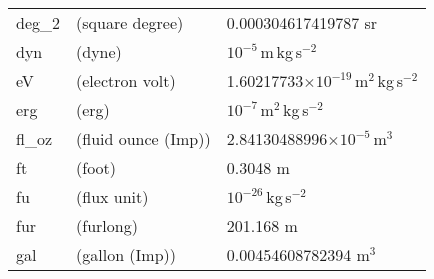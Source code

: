 \begin{table}
\begin{center}
\begin{tabular}{lll}
      deg\_2      & (square degree)               & 0.000304617419787 sr\\
      dyn        & (dyne)                        & $10^{-5}$\,m\,kg\,s$^{-2}$\\
      eV         & (electron volt)               & 1.60217733$\times10^{-19}$\,m$^{2}$\,kg\,s$^{-2}$\\
      erg        & (erg)                         & $10^{-7}$\,m$^{2}$\,kg\,s$^{-2}$\\
      fl\_oz      & (fluid ounce (Imp))           & 2.84130488996$\times10^{-5}$\,m$^{3}$\\
      ft         & (foot)                        & 0.3048 m\\
      fu         & (flux unit)                   & $10^{-26}$\,kg\,s$^{-2}$\\
      fur        & (furlong)                     & 201.168 m\\
      gal        & (gallon (Imp))                & 0.00454608782394
      m$^{3}$\\
\end{tabular}
\end{center}
\end{table}





